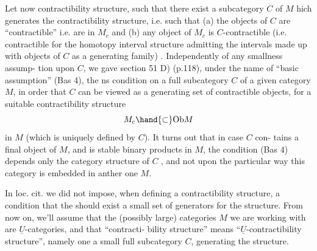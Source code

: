 
 Let now
 contractibility structure, such that
there exist a \hand{\uline{\textcolor{black}{small}}}  subcategory $C$ of $M$ 
hich generates the contractibility structure, i.e. such that 
(a) the objects of $C$ are ``contractible'' i.e. are in $M_c$ and (b) any
object of $M_c$  is $C$-contractible (i.e. contractible for the homotopy
interval structure admitting the intervals made up with objects of $C$ as
a generating family)\hand{,}  . Independently of any smallness assump-%
tion upon $C$, we gave  section 51 D)  (p.118), under the name
of ``basic assumption'' (Bas 4), the ns condition on a full subcategory
$C$ of a given category $M$, in order that $C$ can be viewed as a generating
set of contractible objects, for a suitable contractibility structure
\[ M_c \hand{\subset} \mathrm{Ob} M \]
in $M$ (which is uniquely defined by $C$). It turns out that in case $C$ con-%
 tains a final object of $M$, and is stable   binary products in
$M$, the condition (Bas 4)  depends only   the category structure
of $C$ , and not upon the particular way this category is embedded in
anther one $M$.

In loc. cit. we did not impose, when defining a contractibility
structure, a condition that the should exist a small set of generators
for the structure. From now on, we'll assume that the (possibly large)
categories $M$ we are working with are $\underline{U}$-categories, and that ``contracti-%
bility structure'' means ``$\underline{U}$-contractibility structure'', namely one  
  a small full subcategory $C$, generating the structure.

